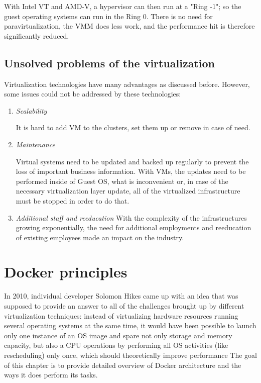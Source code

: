 With Intel VT and AMD-V, a hypervisor can then run at a "Ring -1";
so the guest operating systems can run in the Ring 0.
There is no need for paravirtualization,
the VMM does less work, and
the performance hit is therefore significantly reduced.

\subsection{Unsolved problems of the virtualization}

Virtualization technologies have many advantages as discussed before.
However, some issues could not be addressed by these technologies:
\begin{enumerate}
\item \textit{Scalability}

It is hard to add VM to the clusters,
set them up or remove in case
of need.

\item \textit{Maintenance}

Virtual systems need to be updated and backed up regularly to
prevent the loss of important business information.
With VMs, the updates need to be performed inside of Guest OS,
what is inconvenient or, in case of the necessary virtualization layer update,
all of the virtualized infrastructure must be stopped in order to do that.

\item \textit{Additional staff and reeducation}
With the complexity of the infrastructures
growing exponentially, the need for additional
employments and reeducation of existing employees
made an impact on the industry\cite{VirtualizationProblems}.
\end{enumerate}

\section{Docker principles}

In 2010, individual developer Solomon Hikes came up with an idea that was
supposed to provide an answer to all of the challenges brought up by different
virtualization techniques: instead of virtualizing hardware resources running
several operating systems at the same time, it would have been possible
to launch only one instance of an OS image and spare not only storage and memory capacity,
but also a CPU operations by performing all
OS activities (like rescheduling) only once, which should theoretically
improve performance
The goal of this chapter is to provide detailed overview of Docker architecture
and the ways it does perform its tasks.

